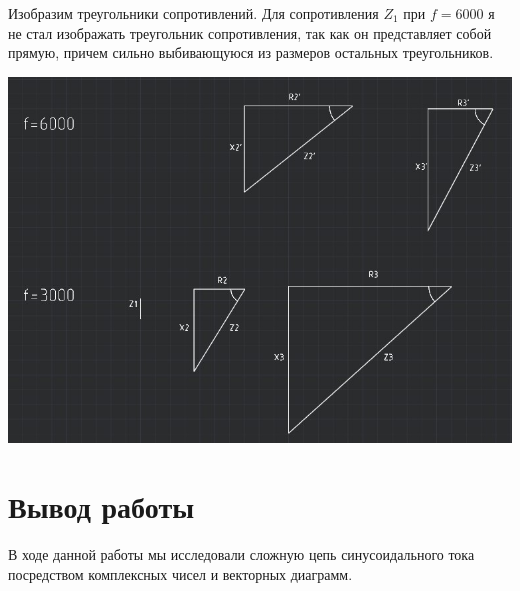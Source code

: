 \documentclass[14pt, a4paper]{article}
\begin{document}
    Изобразим треугольники сопротивлений. Для сопротивления $Z_1$ при $f=6000$ я не стал изображать треугольник сопротивления, так как он представляет собой прямую, причем
    сильно выбивающуюся из размеров остальных треугольников. 

    {\includegraphics[width=1\textwidth]{triangles.jpg}}

    \section*{Вывод работы}
        В ходе данной работы мы исследовали сложную цепь синусоидального тока посредством комплексных чисел и векторных диаграмм.

    
\end{document}
